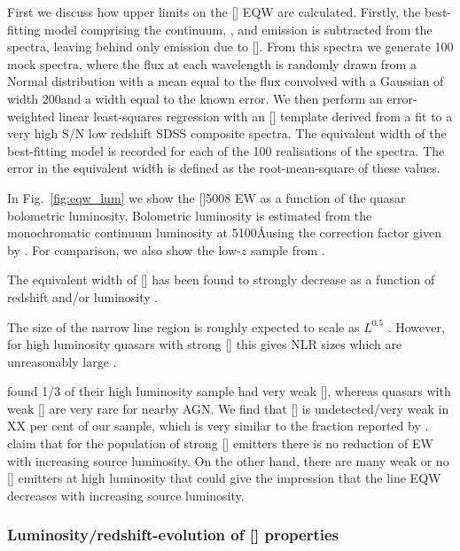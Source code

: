 First we discuss how upper limits on the [] \ac{EQW} are calculated.
Firstly, the best-fitting model comprising the continuum, , and \hb emission is subtracted from the spectra, leaving behind only emission due to []. 
From this spectra we generate 100 mock spectra, where the flux at each wavelength is randomly drawn from a Normal distribution with a mean equal to the flux convolved with a Gaussian of width 200\kms and a width equal to the known error. 
We then perform an error-weighted linear least-squares regression with an [] template derived from a fit to a very high \ac{S/N} low redshift \ac{SDSS} composite spectra. 
The equivalent width of the best-fitting model is recorded for each of the 100 realisations of the spectra. 
The error in the equivalent width is defined as the root-mean-square of these values.

In Fig.~\ref{fig:eqw_lum} we show the []5008 EW as a function of the quasar bolometric luminosity. 
Bolometric luminosity is estimated from the monochromatic continuum luminosity at 5100\AA using the correction factor given by \citet{richards06}. 
For comparison, we also show the low-$z$ sample from \citet{shen11}.  

The equivalent width of [] has been found to strongly decrease as a function of redshift and/or luminosity \citep[e.g.][]{brotherton96,netzer04,sulentic04,baskin05b}. 

The size of the narrow line region is roughly expected to scale as $L^{0.5}$ \citep[e.g.][]{netzer04}. 
However, for high luminosity quasars with strong [] this gives \ac{NLR} sizes which are unreasonably large \citep[$\sim$100 kpc;][]{netzer04}. 

\citet{netzer04} found 1/3 of their high luminosity sample had very weak [], whereas quasars with weak [] are very rare for nearby \ac{AGN}. 
We find that [] is undetected/very weak in XX per cent of our sample, which is very similar to the fraction reported by \citet{netzer04}.  
\citet{netzer04} claim that for the population of strong [] emitters there is no reduction of EW with increasing source luminosity. 
On the other hand, there are many weak or no [] emitters at high luminosity that could give the impression that the line \ac{EQW} decreases with increasing source luminosity. 


\subsubsection{Luminosity/redshift-evolution of [] properties}

